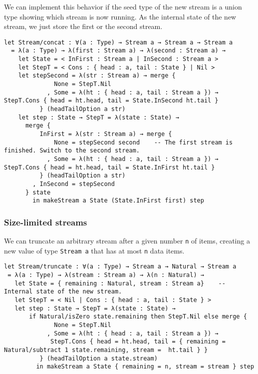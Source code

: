 We can implement this behavior if the seed type of the new stream is a union type showing which stream is now running.
As the internal state of the new stream, we just store the first or the second stream.


\begin{lstlisting}[language=Dhall]
let Stream/concat : ∀(a : Type) → Stream a → Stream a → Stream a
  = λ(a : Type) → λ(first : Stream a) → λ(second : Stream a) →
    let State = < InFirst : Stream a | InSecond : Stream a >
    let StepT = < Cons : { head : a, tail : State } | Nil >
    let stepSecond = λ(str : Stream a) → merge {
              None = StepT.Nil
            , Some = λ(ht : { head : a, tail : Stream a }) → StepT.Cons { head = ht.head, tail = State.InSecond ht.tail }
          } (headTailOption a str)
    let step : State → StepT = λ(state : State) →
      merge {
          InFirst = λ(str : Stream a) → merge {
              None = stepSecond second    -- The first stream is finished. Switch to the second stream.
            , Some = λ(ht : { head : a, tail : Stream a }) → StepT.Cons { head = ht.head, tail = State.InFirst ht.tail }
          } (headTailOption a str) 
        , InSecond = stepSecond
      } state
        in makeStream a State (State.InFirst first) step
\end{lstlisting}


\subsubsection{Size-limited streams}


We can truncate an arbitrary stream after a given number \lstinline!n! of items, creating a new value of type \lstinline!Stream a! that has at most \lstinline!n! data items.


\begin{lstlisting}[language=Dhall]
let Stream/truncate : ∀(a : Type) → Stream a → Natural → Stream a
 = λ(a : Type) → λ(stream : Stream a) → λ(n : Natural) →
   let State = { remaining : Natural, stream : Stream a}    -- Internal state of the new stream.
   let StepT = < Nil | Cons : { head : a, tail : State } >
   let step : State → StepT = λ(state : State) →
       if Natural/isZero state.remaining then StepT.Nil else merge {
              None = StepT.Nil
            , Some = λ(ht : { head : a, tail : Stream a }) → 
             StepT.Cons { head = ht.head, tail = { remaining = Natural/subtract 1 state.remaining, stream =  ht.tail } }
          } (headTailOption a state.stream) 
         in makeStream a State { remaining = n, stream = stream } step
\end{lstlisting}



